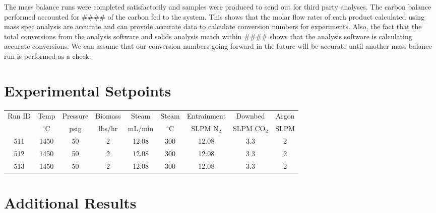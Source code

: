 \documentclass[11pt,twocolumn]{article}
\begin{document}
The mass balance runs were completed satisfactorily and samples were produced to send out for third party analyses.  The carbon balance performed accounted for \#\#\#\# of the carbon fed to the system.  This shows that the molar flow rates of each product calculated using mass spec analysis are accurate and can provide accurate data to calculate conversion numbers for experiments.  Also, the fact that the total conversions from the analysis software and solids analysis match within \#\#\#\# shows that the analysis software is calculating accurate conversions.  We can assume that our conversion numbers going forward in the future will be accurate until another mass balance run is performed as a check.




\newpage
\appendix
\onecolumn

\section{Experimental Setpoints}
\label{ap_setpoints}

\begin{tabular}{c c c c c c c c c}
	\toprule
	\multirow{2}{*}{Run ID} &  Temp &  Pressure &  Biomass &  Steam &  Steam &  Entrainment & Downbed & Argon \\
	{}					& $^\circ$C & psig	& lbs/hr	& mL/min	& $^\circ$C	& SLPM N$_2$	&	SLPM CO$_2$	& SLPM	\\
	\midrule
	511    &       1450 &        50 &             2 &     12.08 &       300 &       12.08 &                3.3 &            2 \\
	512    &       1450 &        50 &             2 &     12.08 &       300 &       12.08 &                3.3 &            2 \\
	513    &       1450 &        50 &             2 &     12.08 &       300 &       12.08 &                3.3 &            2 \\
	\bottomrule
\end{tabular}


\section{Additional Results}
\end{document}
